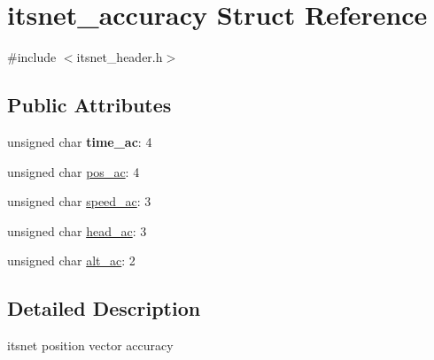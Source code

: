 \hypertarget{structitsnet__accuracy}{\section{itsnet\-\_\-accuracy \-Struct \-Reference}
\label{structitsnet__accuracy}
}


{\ttfamily \#include $<$itsnet\-\_\-header.\-h$>$}

\subsection*{\-Public \-Attributes}
\begin{DoxyCompactItemize}
\item 
\hypertarget{structitsnet__accuracy_ae8ac850ee262deeaaa52e424dcdf7405}{unsigned char {\bfseries time\-\_\-ac}\-: 4}\label{structitsnet__accuracy_ae8ac850ee262deeaaa52e424dcdf7405}

\item 
unsigned char \hyperlink{structitsnet__accuracy_acde597cca8f6b0df3fa50d0c7ac3314c}{pos\-\_\-ac}\-: 4
\item 
unsigned char \hyperlink{structitsnet__accuracy_aade23fb3b4f231e31eb464e88cf2dae1}{speed\-\_\-ac}\-: 3
\item 
unsigned char \hyperlink{structitsnet__accuracy_a08bb692a2154f4499d2749034774d48f}{head\-\_\-ac}\-: 3
\item 
unsigned char \hyperlink{structitsnet__accuracy_a5bcb1aa5a4fa5671af7fc234fd1ff14c}{alt\-\_\-ac}\-: 2
\end{DoxyCompactItemize}


\subsection{\-Detailed \-Description}
itsnet position vector accuracy 

